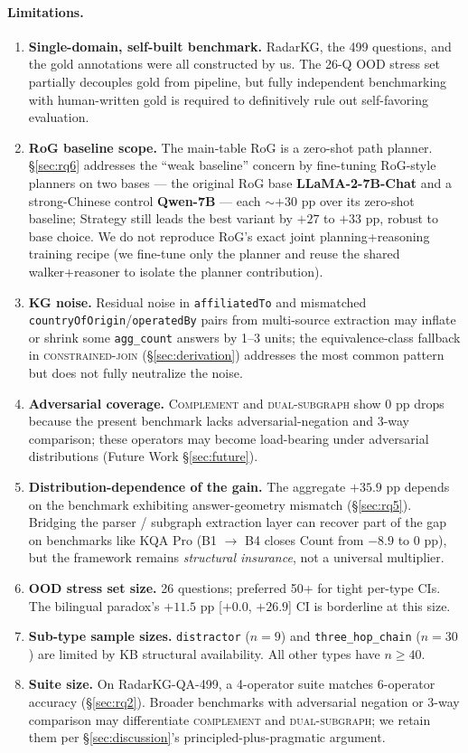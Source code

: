 \documentclass[10pt,a4paper,twocolumn]{article}
\newcommand{\qtype}[1]{\texttt{\small #1}}
\newcommand{\op}[1]{\textsc{\small #1}}
\begin{document}
\paragraph{Limitations.}
\begin{enumerate}[topsep=0pt,itemsep=2pt,leftmargin=*]
  \item \textbf{Single-domain, self-built benchmark.} RadarKG, the 499 questions, and the gold annotations were all constructed by us. The 26-Q OOD stress set partially decouples gold from pipeline, but fully independent benchmarking with human-written gold is required to definitively rule out self-favoring evaluation.
  \item \textbf{RoG baseline scope.} The main-table RoG is a zero-shot path planner. §\ref{sec:rq6} addresses the ``weak baseline'' concern by fine-tuning RoG-style planners on two bases --- the original RoG base \textbf{LLaMA-2-7B-Chat} \citep{luo2024rog} and a strong-Chinese control \textbf{Qwen-7B} --- each ${\sim}{+}30$ pp over its zero-shot baseline; Strategy still leads the best variant by $+27$ to $+33$ pp, robust to base choice. We do not reproduce RoG's exact joint planning+reasoning training recipe (we fine-tune only the planner and reuse the shared walker+reasoner to isolate the planner contribution).
  \item \textbf{KG noise.} Residual noise in \texttt{affiliatedTo} and mismatched \texttt{countryOfOrigin}/\texttt{operatedBy} pairs from multi-source extraction may inflate or shrink some \qtype{agg\_count} answers by 1--3 units; the equivalence-class fallback in \op{constrained-join} (§\ref{sec:derivation}) addresses the most common pattern but does not fully neutralize the noise.
  \item \textbf{Adversarial coverage.} \op{Complement} and \op{dual-subgraph} show 0 pp drops because the present benchmark lacks adversarial-negation and 3-way comparison; these operators may become load-bearing under adversarial distributions (Future Work §\ref{sec:future}).
  \item \textbf{Distribution-dependence of the gain.} The aggregate $+35.9$ pp depends on the benchmark exhibiting answer-geometry mismatch (§\ref{sec:rq5}). Bridging the parser / subgraph extraction layer can recover part of the gap on benchmarks like KQA Pro (B1 $\to$ B4 closes Count from $-8.9$ to 0 pp), but the framework remains \emph{structural insurance}, not a universal multiplier.
  \item \textbf{OOD stress set size.} 26 questions; preferred 50+ for tight per-type CIs. The bilingual paradox's $+11.5$ pp [$+0.0$, $+26.9$] CI is borderline at this size.
  \item \textbf{Sub-type sample sizes.} \qtype{distractor} ($n\!=\!9$) and \qtype{three\_hop\_chain} ($n\!=\!30$) are limited by KB structural availability. All other types have $n \geq 40$.
  \item \textbf{Suite size.} On RadarKG-QA-499, a 4-operator suite matches 6-operator accuracy (§\ref{sec:rq2}). Broader benchmarks with adversarial negation or 3-way comparison may differentiate \op{complement} and \op{dual-subgraph}; we retain them per §\ref{sec:discussion}'s principled-plus-pragmatic argument.
\end{enumerate}
\end{document}
